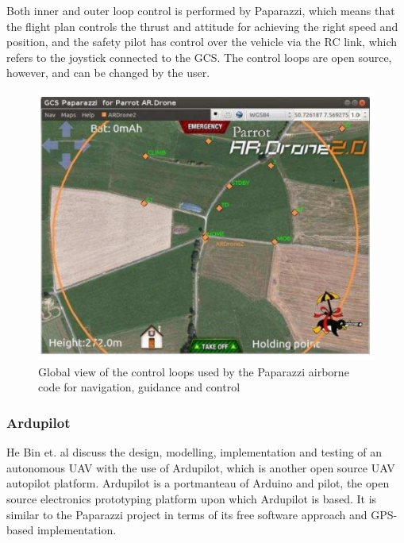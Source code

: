 Both inner and outer loop control is performed by Paparazzi, which means that the flight plan controls the thrust and attitude for achieving the right speed and position, and the safety pilot has control over the vehicle via the RC link, which refers to the joystick connected to the GCS. The control loops are open source, however, and can be changed by the user.

\begin{figure}
\centering	
\includegraphics[scale=0.4]{img/papgcs}	
\caption{Global view of the control loops used by the Paparazzi airborne code for navigation, guidance and control}
\end{figure}

\subsubsection{Ardupilot}
He Bin et. al \cite{ hebin2009} discuss the design, modelling, implementation and testing of an autonomous UAV with the use of Ardupilot, which is another open source UAV autopilot platform. Ardupilot is a portmanteau of Arduino and pilot, the open source electronics prototyping platform upon which Ardupilot is based. It is similar to the Paparazzi project in terms of its free software approach and GPS-based implementation. 

